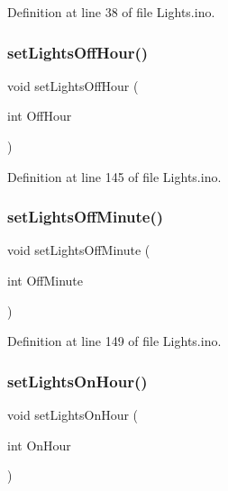 Definition at line 38 of file Lights.\+ino.

\mbox{\label{_lights_8ino_a943802e11b0549a6bf850c91bdc7bdeb}} 
\subsubsection{\texorpdfstring{setLightsOffHour()}{setLightsOffHour()}}
{\footnotesize\ttfamily void set\+Lights\+Off\+Hour (\begin{DoxyParamCaption}\item[{int}]{Off\+Hour }\end{DoxyParamCaption})}



Definition at line 145 of file Lights.\+ino.

\mbox{\label{_lights_8ino_a45f6e552ef9305406dfee593a6ee1ca3}} 
\subsubsection{\texorpdfstring{setLightsOffMinute()}{setLightsOffMinute()}}
{\footnotesize\ttfamily void set\+Lights\+Off\+Minute (\begin{DoxyParamCaption}\item[{int}]{Off\+Minute }\end{DoxyParamCaption})}



Definition at line 149 of file Lights.\+ino.

\mbox{\label{_lights_8ino_aeb59b268327c0d96bb1588204f035d3f}} 
\subsubsection{\texorpdfstring{setLightsOnHour()}{setLightsOnHour()}}
{\footnotesize\ttfamily void set\+Lights\+On\+Hour (\begin{DoxyParamCaption}\item[{int}]{On\+Hour }\end{DoxyParamCaption})}



